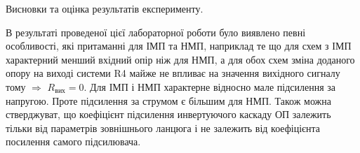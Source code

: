 \documentclass[a4paper,14pt]{extreport}
\begin{document}
\clearpage
\newpage
\begin{center}Висновки та оцінка результатів експерименту.\end{center}\par
В результаті проведеної цієї лабораторної роботи було виявлено певні особливості, які притаманні для ІМП та НМП, наприклад те що для схем з ІМП характерний менший вхідний опір ніж для НМП, а для обох схем зміна доданого опору на виході системи R4 майже не впливає на значення вихідного сигналу тому $\Rightarrow$ $R_{\text{вих}} = 0$. Для ІМП і НМП характерне відносно мале підсилення за напругою. Проте підсилення за струмом є більшим для НМП. Також можна стверджуват, що коефіцієнт підсилення инвертуючого каскаду ОП залежить тільки від параметрів зовнішнього ланцюга і не залежить від коефіцієнта посилення самого підсилювача.

\begin{figure}[h]
\end{figure}
\end{document}
